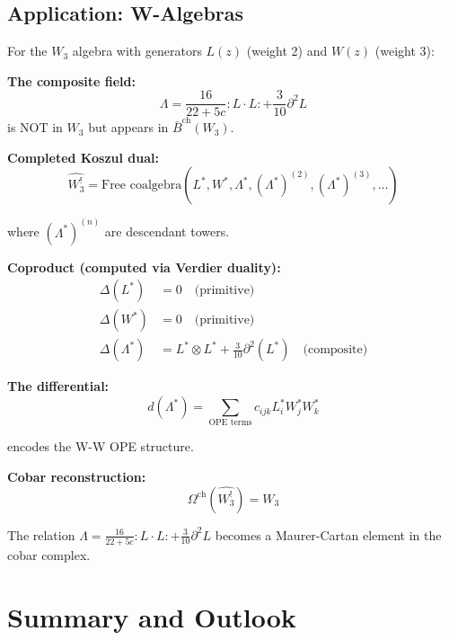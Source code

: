 \subsection{Application: W-Algebras}

\begin{example}\label{ex:W-completion}
For the $W_3$ algebra with generators $L(z)$ (weight 2) and $W(z)$ (weight 3):

\textbf{The composite field:}
$$\Lambda = \frac{16}{22+5c} :L \cdot L: + \frac{3}{10}\partial^2 L$$
is NOT in $W_3$ but appears in $\bar{B}^{\text{ch}}(W_3)$.

\textbf{Completed Koszul dual:}
$$\widehat{W_3^!} = \text{Free coalgebra}(L^*, W^*, \Lambda^*, (\Lambda^*)^{(2)}, (\Lambda^*)^{(3)}, \ldots)$$

where $(\Lambda^*)^{(n)}$ are descendant towers.

\textbf{Coproduct (computed via Verdier duality):}
\begin{align*}
\Delta(L^*) &= 0 \quad \text{(primitive)}\\
\Delta(W^*) &= 0 \quad \text{(primitive)}\\
\Delta(\Lambda^*) &= L^* \otimes L^* + \frac{3}{10}\partial^2(L^*) \quad \text{(composite)}
\end{align*}

\textbf{The differential:}
$$d(\Lambda^*) = \sum_{\text{OPE terms}} c_{ijk} L^*_i W^*_j W^*_k$$

encodes the W-W OPE structure.

\textbf{Cobar reconstruction:}
$$\Omega^{\text{ch}}(\widehat{W_3^!}) = W_3$$

The relation $\Lambda = \frac{16}{22+5c} :L \cdot L: + \frac{3}{10}\partial^2 L$ becomes a Maurer-Cartan element in the cobar complex.
\end{example}

\section{Summary and Outlook}

